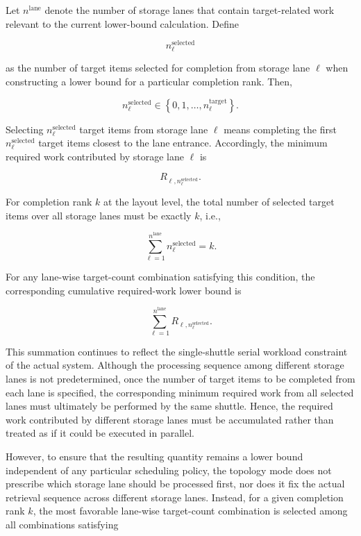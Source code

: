 Let \(n^{\mathrm{lane}}\) denote the number of storage lanes that contain
target-related work relevant to the current lower-bound calculation. Define

\[
n_{\ell}^{\mathrm{selected}}
\]

as the number of target items selected for completion from storage lane
\(\ell\) when constructing a lower bound for a particular completion rank.
Then,

\[
n_{\ell}^{\mathrm{selected}}
\in
\left\{
0,1,\ldots,n_{\ell}^{\mathrm{target}}
\right\}.
\]

Selecting \(n_{\ell}^{\mathrm{selected}}\) target items from storage lane
\(\ell\) means completing the first
\(n_{\ell}^{\mathrm{selected}}\) target items closest to the lane entrance.
Accordingly, the minimum required work contributed by storage lane \(\ell\) is

\[
R_{\ell,n_{\ell}^{\mathrm{selected}}}.
\]

For completion rank \(k\) at the layout level, the total number of selected
target items over all storage lanes must be exactly \(k\), i.e.,

\[
\sum_{\ell=1}^{n^{\mathrm{lane}}}
n_{\ell}^{\mathrm{selected}}
=
k.
\]

For any lane-wise target-count combination satisfying this condition, the
corresponding cumulative required-work lower bound is

\[
\sum_{\ell=1}^{n^{\mathrm{lane}}}
R_{\ell,n_{\ell}^{\mathrm{selected}}}.
\]

This summation continues to reflect the single-shuttle serial workload
constraint of the actual system. Although the processing sequence among
different storage lanes is not predetermined, once the number of target items
to be completed from each lane is specified, the corresponding minimum
required work from all selected lanes must ultimately be performed by the same
shuttle. Hence, the required work contributed by different storage lanes must
be accumulated rather than treated as if it could be executed in parallel.

However, to ensure that the resulting quantity remains a lower bound
independent of any particular scheduling policy, the topology mode does not
prescribe which storage lane should be processed first, nor does it fix the
actual retrieval sequence across different storage lanes. Instead, for a given
completion rank \(k\), the most favorable lane-wise target-count combination is
selected among all combinations satisfying

